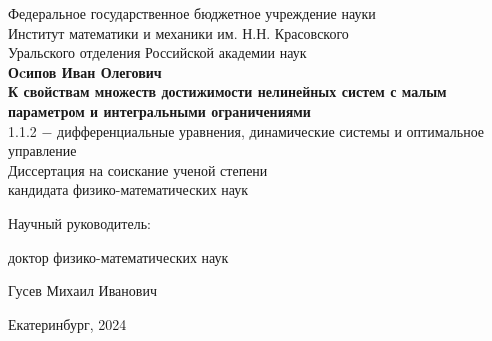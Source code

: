\documentclass[../main.tex]{subfiles}
\begin{document}
	\begin{titlepage}
	    \begin{center}
		\Large{Федеральное государственное бюджетное учреждение науки} \\
		\Large{Институт математики и механики им. Н.Н. Красовского} \\ 
		\Large{Уральского отделения Российской академии наук} \\ 
        \vspace*{4cm}
		\Large{\textbf{Оcипов Иван Олегович}}\\
		\vspace*{1cm}
		\LARGE{\textbf{К свойствам множеств достижимости нелинейных систем с малым параметром и интегральными ограничениями}}\\
		\vspace*{2cm}
		\Large{1.1.2 $-$ дифференциальные уравнения, динамические системы и оптимальное управление}\\
		\vspace*{1cm}
		\Large{Диссертация на соискание ученой степени \\
		кандидата физико-математических наук}\\
		\end{center}
	    \vspace*{1cm}
	    
		\hspace*{8cm}\Large{Научный руководитель:} 

		\hspace*{8cm}\Large{доктор физико-математических наук} 

		\hspace*{8cm}\Large{Гусев Михаил Иванович} 
		
		\vspace*{\fill}
		\begin{center}
	    \Large{Екатеринбург, 2024}
	    \end{center}
	\end{titlepage}
\end{document}
